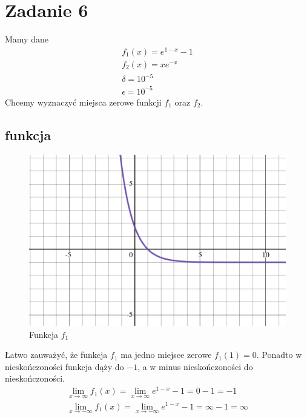 \documentclass{article}
\begin{document}
\section*{Zadanie 6}
Mamy dane
\begin{gather*}
f_1(x) = e^{1-x} - 1\\
f_2(x) = xe^{-x}\\
\delta = 10^{-5}\\
\epsilon = 10^{-5}
\end{gather*}
Chcemy wyznaczyć miejsca zerowe funkcji $f_1$ oraz $f_2$.

\subsection*{funkcja }
\begin{figure}[H]
  \centering
  \includegraphics[width=\textwidth]{./ex6f1.png}
  \caption{Funkcja $f_1$}
\end{figure}
Łatwo zauważyć, że funkcja $f_1$ ma jedno miejsce zerowe
$f_1(1) = 0$. Ponadto w nieskończoności funkcja dąży do $-1$,
a w minus nieskończoności do nieskończoności.
\begin{gather*}
  \lim_{x \to \infty} f_1(x) = \lim_{x \to \infty} e^{1-x} - 1 = 0 - 1 = -1\\
  \lim_{x \to -\infty} f_1(x) = \lim_{x \to -\infty} e^{1-x} - 1 = \infty - 1 = \infty
\end{gather*}
\end{document}
